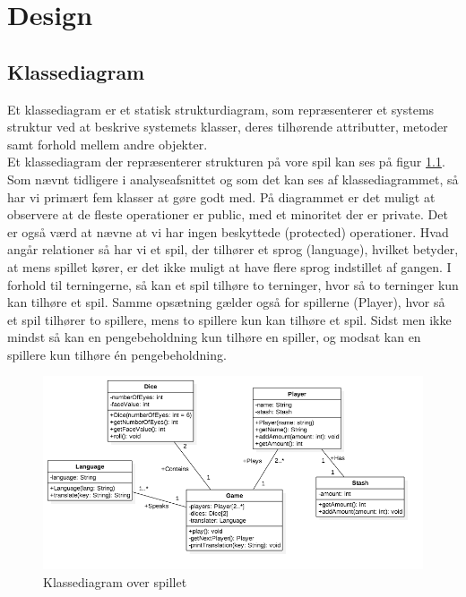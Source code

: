 \chapter{Design}



\section{Klassediagram}

\noindent Et klassediagram er et statisk strukturdiagram, som repræsenterer et systems struktur ved at beskrive systemets klasser, deres tilhørende attributter, metoder samt forhold mellem andre objekter.\\

\noindent Et klassediagram der repræsenterer strukturen på vore spil kan ses på figur \ref{fig:class_diagram}.
Som nævnt tidligere i analyseafsnittet og som det kan ses af klassediagrammet, så har vi primært fem klasser at gøre godt med.
På diagrammet er det muligt at observere at de fleste operationer er public, med et minoritet der er private.
Det er også værd at nævne at vi har ingen beskyttede (protected) operationer.
Hvad angår relationer så har vi et spil, der tilhører et sprog (language), hvilket betyder, at mens spillet kører, er det ikke muligt at have flere sprog indstillet af gangen.
I forhold til terningerne, så kan et spil tilhøre to terninger, hvor så to terninger kun kan tilhøre et spil.
Samme opsætning gælder også for spillerne (Player), hvor så et spil tilhører to spillere, mens to spillere kun kan tilhøre et spil.
Sidst men ikke mindst så kan en pengebeholdning kun tilhøre en spiller, og modsat kan en spillere kun tilhøre én pengebeholdning.\\

\begin{figure}[H]
    \begin{center}
        \includegraphics[width=15cm]{graphics/Class_Diagram.png}
        \caption{Klassediagram over spillet}
        \label{fig:class_diagram}
    \end{center}
\end{figure}


